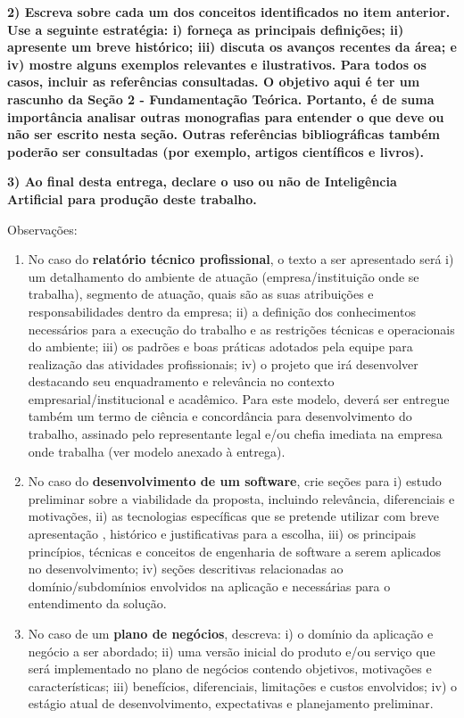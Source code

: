 \documentclass[
	12pt,				%
	openright,			%
	oneside,			%
	a4paper,			%
	chapter=TITLE,		%
	subsection=TITLE,	%
	english,			%
	brazil,				%
	]{abntex2}
\begin{document}
\textbf{2) Escreva sobre cada um dos conceitos identificados no item anterior. Use a seguinte estratégia: i) forneça as principais definições; ii) apresente um breve histórico; iii) discuta os avanços recentes da área; e iv) mostre alguns exemplos relevantes e ilustrativos. Para todos os casos, incluir as referências consultadas. O objetivo aqui é ter um rascunho da Seção 2 - Fundamentação Teórica. Portanto, é de suma importância analisar outras monografias para entender o que deve ou não ser escrito nesta seção. Outras referências bibliográficas também poderão ser consultadas (por exemplo, artigos científicos e livros).}

\textbf{3) Ao final desta entrega, declare o uso ou não de Inteligência Artificial para produção deste trabalho.}

Observações:
\begin{enumerate}
    \item No caso do \textbf{relatório técnico profissional}, o texto a ser apresentado será i) um detalhamento do ambiente de atuação (empresa/instituição onde se trabalha), segmento de atuação, quais são as suas atribuições e responsabilidades dentro da empresa; ii) a definição dos conhecimentos necessários para a execução do trabalho e as restrições técnicas e operacionais do ambiente; iii) os padrões e boas práticas adotados pela equipe para realização das atividades profissionais; iv) o projeto que irá desenvolver destacando seu enquadramento e relevância no contexto empresarial/institucional e acadêmico. Para este modelo, deverá ser entregue também um termo de ciência e concordância para desenvolvimento do trabalho, assinado pelo representante legal e/ou chefia imediata na empresa onde trabalha (ver modelo anexado à entrega).
    \item No caso do \textbf{desenvolvimento de um software}, crie seções para i) estudo preliminar sobre a viabilidade da proposta, incluindo relevância, diferenciais e motivações, ii) as tecnologias específicas que se pretende utilizar com breve apresentação , histórico e justificativas para a escolha, iii) os principais princípios, técnicas e conceitos de engenharia de software a serem aplicados no desenvolvimento; iv) seções descritivas relacionadas ao domínio/subdomínios envolvidos na aplicação e necessárias para o entendimento da solução.
    \item No caso de um \textbf{plano de negócios}, descreva: i) o domínio da aplicação e negócio a ser abordado; ii) uma versão inicial do produto e/ou  serviço que será implementado no plano de negócios contendo objetivos, motivações e características; iii) benefícios, diferenciais, limitações e custos envolvidos; iv) o estágio atual de desenvolvimento, expectativas e planejamento preliminar.

\end{enumerate}
\end{document}
